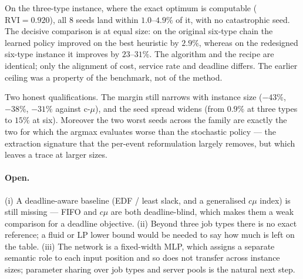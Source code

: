 \documentclass[11pt,a4paper]{article}
\begin{document}
On the three-type instance, where the exact optimum is computable
($\mathrm{RVI} = 0.920$), all 8 seeds land within $1.0$--$4.9\%$ of it, with no
catastrophic seed.  The decisive comparison is at equal size: on the original
six-type chain the learned policy improved on the best heuristic by $2.9\%$,
whereas on the redesigned six-type instance it improves by $23$--$31\%$.  The
algorithm and the recipe are identical; only the alignment of cost, service
rate and deadline differs.  The earlier ceiling was a property of the
benchmark, not of the method.

Two honest qualifications.  The margin still narrows with instance size
($-43\%$, $-38\%$, $-31\%$ against c-$\mu$), and the seed spread widens (from
$0.9\%$ at three types to $15\%$ at six).  Moreover the two worst seeds across
the family are exactly the two for which the argmax evaluates worse than the
stochastic policy --- the extraction signature that the per-event reformulation
largely removes, but which leaves a trace at larger sizes.

\paragraph{Open.}
(i) A deadline-aware baseline (EDF / least slack, and a generalised $c\mu$
index) is still missing --- FIFO and $c\mu$ are both deadline-blind, which makes
them a weak comparison for a deadline objective.
(ii) Beyond three job types there is no exact reference; a fluid or LP lower
bound would be needed to say how much is left on the table.
(iii) The network is a fixed-width MLP, which assigns a separate semantic role
to each input position and so does not transfer across instance sizes;
parameter sharing over job types and server pools is the natural next step.
\end{document}
